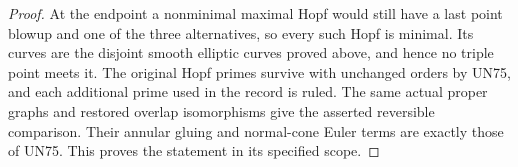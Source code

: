 \begin{proof}
At the endpoint a nonminimal maximal
Hopf would still have a last point
blowup and one of the three alternatives,
so every such Hopf is minimal.  Its
curves are the disjoint smooth elliptic
curves proved above, and hence no
triple point meets it.  The original
Hopf primes survive with unchanged
orders by UN75, and each additional
prime used in the record is ruled.
The same actual proper graphs and
restored overlap isomorphisms give
the asserted reversible comparison.
Their annular gluing and normal-cone
Euler terms are exactly those of UN75.
This proves the statement in its
specified scope.
\end{proof}
